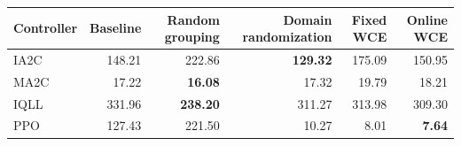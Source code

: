 \begin{tabular}{lrrrrr}
\hline
Controller & Baseline & Random grouping & Domain randomization & Fixed WCE & Online WCE \\
\hline
IA2C & 148.21 & 222.86 & \textbf{129.32} & 175.09 & 150.95 \\
MA2C & 17.22 & \textbf{16.08} & 17.32 & 19.79 & 18.21 \\
IQLL & 331.96 & \textbf{238.20} & 311.27 & 313.98 & 309.30 \\
PPO & 127.43 & 221.50 & 10.27 & 8.01 & \textbf{7.64} \\
\hline
\end{tabular}
